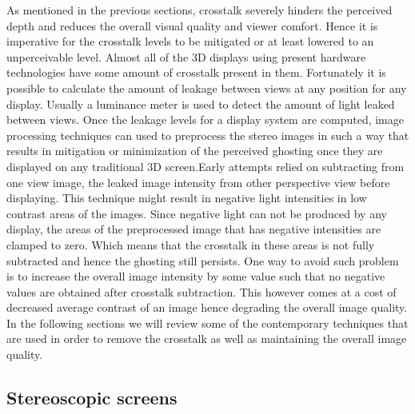 As mentioned in the previous sections, crosstalk severely hinders the perceived depth and reduces the overall visual quality and viewer comfort. Hence it is imperative for the crosstalk levels to be mitigated or at least lowered to an unperceivable level. Almost all of the 3D displays using present hardware technologies have some amount of crosstalk present in them. Fortunately it is possible to calculate the amount of leakage between views at any position for any display. Usually a luminance meter is used to detect the amount of light leaked between views. Once the leakage levels for a display system are computed, image processing techniques can used to preprocess the stereo images in such a way that results in mitigation or minimization of the perceived ghosting once they are displayed on any traditional 3D screen.Early attempts relied on subtracting from one view image, the leaked image intensity from other perspective view before displaying. This technique might result in  negative light intensities in low contrast areas of the images. Since negative light can not be produced by any display, the areas of the preprocessed image that has negative intensities are clamped to zero. Which means that the crosstalk in these areas is not fully subtracted and hence the ghosting still persists. One way to avoid such problem is to increase the overall image intensity by some value such that no negative values are obtained after crosstalk subtraction. This however comes at a cost of decreased average contrast of an image hence degrading the overall image quality. In the following sections we will review some of the contemporary techniques that are used in order to remove the crosstalk as well as maintaining the overall image quality.

\subsection{Stereoscopic screens}

